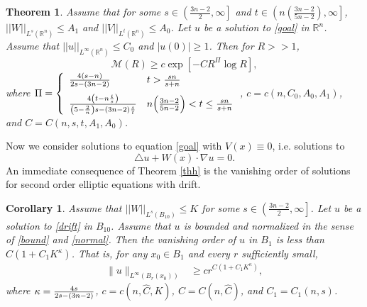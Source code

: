 \documentclass[11pt]{amsart}
\theoremstyle{plain}
\newtheorem{corollary}{Corollary}
\newtheorem{theorem}{Theorem}
\numberwithin{equation}{section}
\begin{document}
\begin{theorem}
Assume that for some $s \in {\left( {\frac{3n-2}{2}, {\infty}} \right] }$ and $t \in {\left( { n{\left( {\frac{3n-2}{5n-2}} \right) }, {\infty}} \right] }$, ${\left\vert\left\vert {W}\right\vert\right\vert}_{L^s{\left( {{\ensuremath{\mathbb{R}}}^n} \right) }} \le A_1$ and ${\left\vert\left\vert {V}\right\vert\right\vert}_{L^t{\left( {{\ensuremath{\mathbb{R}}}^n} \right) }} \le A_0$.
Let $u$ be a solution to \eqref{goal} in ${\ensuremath{\mathbb{R}}}^n$.
Assume that ${\left\vert\left\vert {u}\right\vert\right\vert}_{L^{\infty}{\left( {{\ensuremath{\mathbb{R}}}^n} \right) }} \le C_0$ and ${\left\vert{u{\left( {0} \right) }}\right\vert} \ge 1$.
Then for $R >> 1$,
\begin{equation*}
\mathcal{M}{\left( {R} \right) } \ge c \exp{\left[{-C R^\Pi \log R}\right]},
\end{equation*}
where
${\displaystyle}
\Pi = \left\{\begin{array}{ll}
\frac{4{\left( {s-n} \right) }}{2s - {\left( {3n-2} \right) }} & t > \frac{sn}{s+n} \medskip \\
\frac{4 {\left( {t-n\frac t s} \right) }}{{\left( {5 - \frac 2 n} \right) }s - {\left( {3n-2} \right) } \frac s t} & n{\left( {\frac{3n-2}{5n-2}} \right) } < t \le \frac{sn}{s+n}
\end{array}\right.
$, $c = c{\left( {n, C_0, A_0, A_1} \right) }$, \\ and $C = C{\left( {n, s, t, A_1,
A_0} \right) }$. \label{UCVW}
\end{theorem}

Now we consider solutions to equation \eqref{goal} with $V(x)\equiv0$, i.e. solutions to
\begin{equation}
\triangle u+W(x) \cdot \nabla u=0.
\label{drift}
\end{equation}
An immediate consequence of Theorem \ref{thh} is the vanishing order of solutions for second order elliptic equations with drift.

\begin{corollary}
Assume that ${\left\vert\left\vert {W}\right\vert\right\vert}_{L^s{\left( {B_{10}} \right) }} \le K$ for some $s \in
{\left( {\frac{3n-2}{2}, {\infty}} \right] }$. Let $u$ be a solution to \eqref{drift}
in $B_{10}$. Assume that $u$ is bounded and normalized in the sense
of \eqref{bound} and \eqref{normal}. Then the vanishing order of $u$
in $B_{1}$ is less than $C{\left( {1 + C_1 K^\kappa } \right) }$. That is, for any
$x_0\in B_1$ and every $r$ sufficiently small,
\begin{align*}
 \|u\|_{L^{\infty}(B_{r}(x_0))}
 &\ge c r^{C{\left( {1 + C_1 K^\kappa } \right) }},
\end{align*}
where ${\displaystyle} \kappa = \frac{4s}{2s - {\left( {3n-2} \right) }}$, $c = c{\left( {n, \hat
C, K} \right) }$, $C = C{\left( {n, \hat C} \right) }$, and $C_1 = C_1{\left( {n, s} \right) }$.
\label{thhCor}
\end{corollary}
\end{document}
